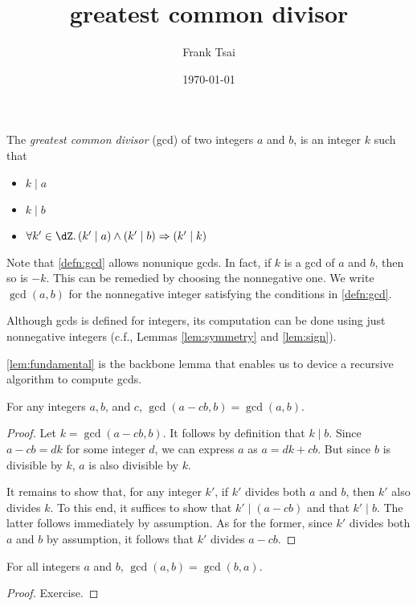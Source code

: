 \documentclass[article,10pt,oneside]{memoir}
\title{greatest common divisor}
\author{Frank Tsai}
\date{\today}
\begin{document}
\maketitle

\begin{defn}\label{defn:gcd}
  The \emph{greatest common divisor} (gcd) of two integers $a$ and $b$, is an integer $k$ such that
  \begin{itemize}
  \item $k \mid a$
  \item $k \mid b$
  \item $\forall k' \in \dZ.\,(k' \mid a) \wedge (k' \mid b) \imp (k' \mid k)$
  \end{itemize}
\end{defn}

\begin{rmk}
  Note that \cref{defn:gcd} allows nonunique gcds.
  In fact, if $k$ is a gcd of $a$ and $b$, then so is $-k$.
  This can be remedied by choosing the nonnegative one.
  We write $\gcd(a, b)$ for the nonnegative integer satisfying the conditions in \cref{defn:gcd}.
\end{rmk}

\begin{rmk}
  Although gcds is defined for integers, its computation can be done using just nonnegative integers (c.f., Lemmas \ref{lem:symmetry} and \ref{lem:sign}).
\end{rmk}

\cref{lem:fundamental} is the backbone lemma that enables us to device a recursive algorithm to compute gcds.
\begin{lem}\label{lem:fundamental}
  For any integers $a, b$, and $c$, $\gcd(a - cb, b) = \gcd(a,b)$.
\end{lem}
\begin{proof}
  Let $k = \gcd(a - cb, b)$.
  It follows by definition that $k \mid b$.
  Since $a - cb = dk$ for some integer $d$, we can express $a$ as $a = dk + cb$.
  But since $b$ is divisible by $k$, $a$ is also divisible by $k$.
  
  It remains to show that, for any integer $k'$, if $k'$ divides both $a$ and $b$, then $k'$ also divides $k$.
  To this end, it suffices to show that $k' \mid (a - cb)$ and that $k' \mid b$.
  The latter follows immediately by assumption.
  As for the former, since $k'$ divides both $a$ and $b$ by assumption, it follows that $k'$ divides $a - cb$.
\end{proof}

\begin{lem}\label{lem:symmetry}
  For all integers $a$ and $b$, $\gcd(a, b) = \gcd(b, a)$.
\end{lem}
\begin{proof}
  Exercise.
\end{proof}
\end{document}
